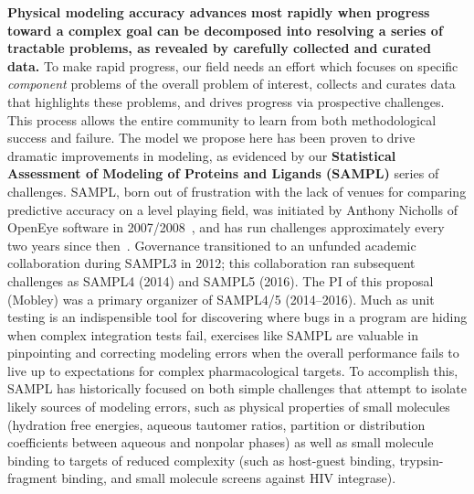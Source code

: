 \documentclass[11pt]{article}
\begin{document}
\textbf{Physical modeling accuracy advances most rapidly when progress toward a complex goal can be decomposed into resolving a series of tractable problems, as revealed by carefully collected and curated data.}
To make rapid progress, our field needs an effort which focuses on specific \emph{component} problems of the overall problem of interest, collects and curates data that highlights these problems, and drives progress via prospective challenges.
This process allows the entire community to learn from both methodological success and failure. 
The model we propose here has been proven to drive dramatic improvements in modeling, as evidenced by our {\bf Statistical Assessment of Modeling of Proteins and Ligands (SAMPL)} series of challenges. 
SAMPL, born out of frustration with the lack of venues for comparing predictive accuracy on a level playing field, was initiated by Anthony Nicholls of OpenEye software in 2007/2008~\cite{nicholls_predicting_2008}, and has run challenges approximately every two years since then~\cite{nicholls_samp1_2009, mobley_predictions_2009, geballe_sampl2_2010, geballe_sampl3_2012, mobley_blind_2014-1, muddana_sampl4_2014, bannan_blind_2016, yin_overview_2016}.
Governance transitioned to an unfunded academic collaboration during SAMPL3 in 2012; this collaboration ran subsequent challenges as SAMPL4 (2014) and SAMPL5 (2016).
The PI of this proposal (Mobley) was a primary organizer of SAMPL4/5 (2014--2016).
Much as unit testing is an indispensible tool for discovering where bugs in a program are hiding when complex integration tests fail, exercises like SAMPL are valuable in pinpointing and correcting modeling errors when the overall performance fails to live up to expectations for complex pharmacological targets.
To accomplish this, SAMPL has historically focused on both simple challenges that attempt to isolate likely sources of modeling errors, such as physical properties of small molecules (hydration free energies, aqueous tautomer ratios, partition or distribution coefficients between aqueous and nonpolar phases) as well as small molecule binding to targets of reduced complexity (such as host-guest binding, trypsin-fragment binding, and small molecule screens against HIV integrase).
\end{document}
